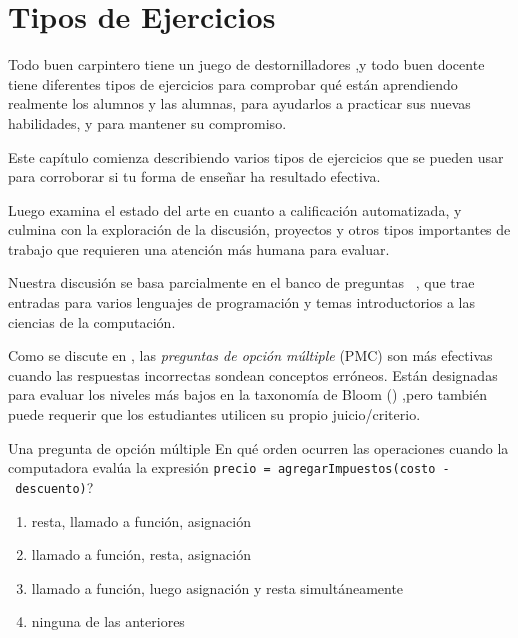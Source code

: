 \chapter{Tipos de Ejercicios}\label{s:exercises}

Todo buen carpintero tiene un juego de destornilladores ,y todo buen docente tiene diferentes tipos de ejercicios para comprobar qué están aprendiendo realmente los alumnos y las alumnas, para ayudarlos a practicar sus nuevas habilidades, y para mantener su  compromiso.

Este capítulo comienza describiendo varios tipos de ejercicios que se pueden usar para corroborar si tu forma de enseñar ha resultado efectiva.

Luego examina el estado del arte en cuanto a calificación automatizada, y culmina con la exploración de la discusión, proyectos y otros tipos importantes de trabajo que requieren una atención más humana para evaluar.

Nuestra discusión se basa parcialmente en el banco de preguntas ~\cite{Sand2013}, que trae entradas para varios lenguajes de programación y temas introductorios a las ciencias de la computación.


Como se discute en , las \emph{preguntas de opción múltiple} (PMC)  son más efectivas cuando las respuestas incorrectas sondean conceptos erróneos.  
Están designadas para evaluar los niveles más bajos en la taxonomía de Bloom
() ,pero también puede requerir que los estudiantes utilicen su propio juicio/criterio.

\begin{aside}{Una pregunta de opción múltiple}
  En qué orden ocurren las operaciones cuando la computadora evalúa la expresión \texttt{precio\ =\ agregarImpuestos(costo\ -\ descuento)}?
  \begin{enumerate}
  \item
    resta, llamado a función, asignación
  \item
    llamado a función, resta, asignación
  \item
    llamado a función, luego asignación y resta simultáneamente
  \item
    ninguna de las anteriores
  \end{enumerate}
\end{aside}


